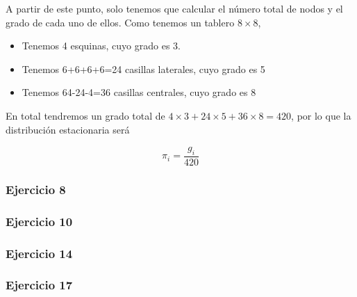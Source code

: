 A partir de este punto, solo tenemos que calcular el número total de nodos y el grado de cada uno de ellos. Como tenemos un tablero $8\times 8$, 
\begin{itemize}
    \item Tenemos 4 esquinas, cuyo grado es 3.
    \item Tenemos 6+6+6+6=24 casillas laterales, cuyo grado es 5
    \item Tenemos 64-24-4=36 casillas centrales, cuyo grado es 8
\end{itemize}

En total tendremos un grado total de $4\times3+24\times5+36\times8=420$, por lo que la distribución estacionaria será

$$
\pi_i=\frac{g_i}{420}
$$

\subsubsection{Ejercicio 8}
\subsubsection{Ejercicio 10}
\subsubsection{Ejercicio 14}
\subsubsection{Ejercicio 17}


